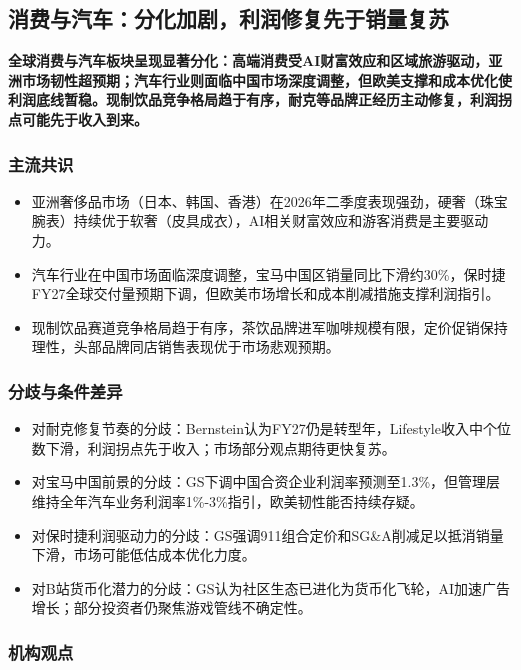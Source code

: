 \documentclass[11pt]{ctexart}
\begin{document}
\subsection{消费与汽车：分化加剧，利润修复先于销量复苏}
\textbf{全球消费与汽车板块呈现显著分化：高端消费受AI财富效应和区域旅游驱动，亚洲市场韧性超预期；汽车行业则面临中国市场深度调整，但欧美支撑和成本优化使利润底线暂稳。现制饮品竞争格局趋于有序，耐克等品牌正经历主动修复，利润拐点可能先于收入到来。}
\subsubsection*{主流共识}
\begin{itemize}
  \item 亚洲奢侈品市场（日本、韩国、香港）在2026年二季度表现强劲，硬奢（珠宝腕表）持续优于软奢（皮具成衣），AI相关财富效应和游客消费是主要驱动力。
  \item 汽车行业在中国市场面临深度调整，宝马中国区销量同比下滑约30\%，保时捷FY27全球交付量预期下调，但欧美市场增长和成本削减措施支撑利润指引。
  \item 现制饮品赛道竞争格局趋于有序，茶饮品牌进军咖啡规模有限，定价促销保持理性，头部品牌同店销售表现优于市场悲观预期。
\end{itemize}
\subsubsection*{分歧与条件差异}
\begin{itemize}
  \item 对耐克修复节奏的分歧：Bernstein认为FY27仍是转型年，Lifestyle收入中个位数下滑，利润拐点先于收入；市场部分观点期待更快复苏。
  \item 对宝马中国前景的分歧：GS下调中国合资企业利润率预测至1.3\%，但管理层维持全年汽车业务利润率1\%-3\%指引，欧美韧性能否持续存疑。
  \item 对保时捷利润驱动力的分歧：GS强调911组合定价和SG\&A削减足以抵消销量下滑，市场可能低估成本优化力度。
  \item 对B站货币化潜力的分歧：GS认为社区生态已进化为货币化飞轮，AI加速广告增长；部分投资者仍聚焦游戏管线不确定性。
\end{itemize}
\subsubsection*{机构观点}
\end{document}
